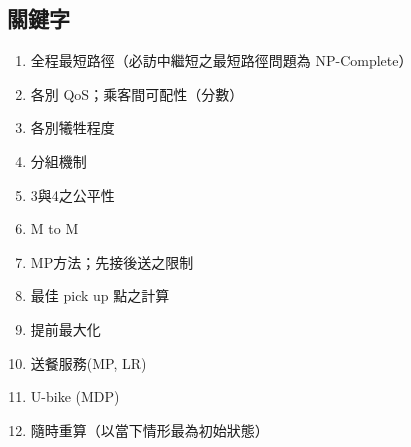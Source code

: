 \documentclass{article}
\begin{document}
\subsection*{關鍵字}
\begin{enumerate}
  \def\labelenumi{\arabic{enumi}.}
  \item 全程最短路徑（必訪中繼短之最短路徑問題為 NP-Complete）
  \item 各別 QoS；乘客間可配性（分數）
  \item 各別犧牲程度
  \item 分組機制
  \item 3與4之公平性
  \item M to M
  \item MP方法；先接後送之限制
  \item 最佳 pick up 點之計算
  \item 提前最大化
  \item 送餐服務(MP, LR)
  \item U-bike (MDP)
  \item 隨時重算（以當下情形最為初始狀態）
\end{enumerate}
\end{document}
